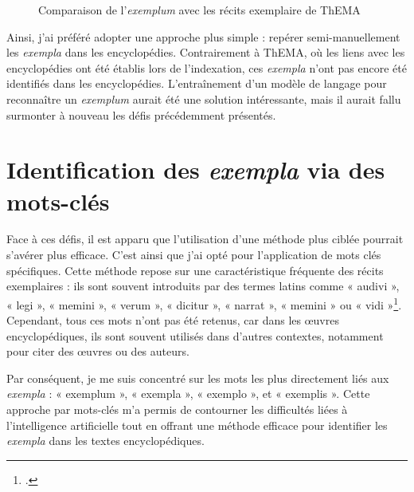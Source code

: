 \begin{figure}[H]
	\centering
	\caption{Comparaison de l'\textit{exemplum} avec les récits exemplaire de ThEMA}
\end{figure}

Ainsi, j'ai préféré adopter une approche plus simple : repérer semi-manuellement les \textit{exempla} dans les encyclopédies. Contrairement à ThEMA, où les liens avec les encyclopédies ont été établis lors de l'indexation, ces \textit{exempla} n'ont pas encore été identifiés dans les encyclopédies. L'entraînement d'un modèle de langage pour reconnaître un \textit{exemplum} aurait été une solution intéressante, mais il aurait fallu surmonter à nouveau les défis précédemment présentés.


\section{Identification des \textit{exempla} via des mots-clés}
Face à ces défis, il est apparu que l'utilisation d'une méthode plus ciblée pourrait s'avérer plus efficace. C'est ainsi que j'ai opté pour l'application de mots clés spécifiques. Cette méthode repose sur une caractéristique fréquente des récits exemplaires : ils sont souvent introduits par des termes latins comme « audivi », « legi », « memini », « verum », « dicitur », « narrat », « memini » ou « vidi »\footcite{bremondclaudeExemplum1982}. Cependant, tous ces mots n'ont pas été retenus, car dans les œuvres encyclopédiques, ils sont souvent utilisés dans d'autres contextes, notamment pour citer des œuvres ou des auteurs.

Par conséquent, je me suis concentré sur les mots les plus directement liés aux \textit{exempla} : « exemplum », « exempla », « exemplo », et « exemplis ». Cette approche par mots-clés m'a permis de contourner les difficultés liées à l'intelligence artificielle tout en offrant une méthode efficace pour identifier les \textit{exempla} dans les textes encyclopédiques.

